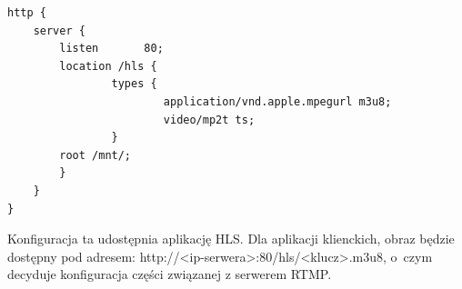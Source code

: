 \begin{verbatim}
http {
    server {
        listen       80;
        location /hls {
                types {
                        application/vnd.apple.mpegurl m3u8;
                        video/mp2t ts;
                }
        root /mnt/;
        }
    }
}
\end{verbatim}

Konfiguracja ta udostępnia aplikację HLS. Dla aplikacji klienckich, obraz będzie dostępny pod adresem: http://<ip-serwera>:80/hls/<klucz>.m3u8, o~czym decyduje konfiguracja części związanej z serwerem RTMP.

